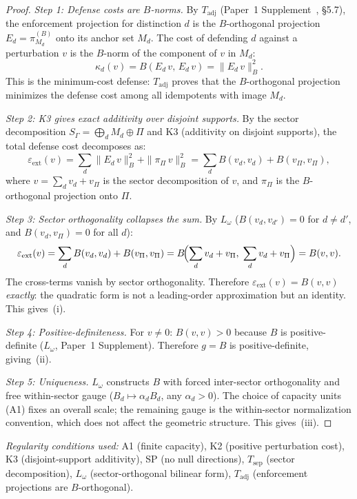 \documentclass[11pt,a4paper]{article}
\theoremstyle{definition}
\begin{document}
\begin{proof}
\textit{Step 1: Defense costs are $B$-norms.}\quad
By $T_{\mathrm{adj}}$ (Paper~1 Supplement~\cite{BrookeSupplement}, \S5.7),
the enforcement projection for distinction $d$ is the $B$-orthogonal
projection $E_d = \pi_{M_d}^{(B)}$ onto its anchor set $M_d$.  The cost
of defending $d$ against a perturbation $v$ is the $B$-norm of the
component of $v$ in $M_d$:
\[
  \kappa_d(v) = B(E_d\, v,\, E_d\, v) = \|E_d\, v\|_B^2.
\]
This is the minimum-cost defense: $T_{\mathrm{adj}}$ proves that the
$B$-orthogonal projection minimizes the defense cost among all
idempotents with image $M_d$.

\textit{Step 2: K3 gives exact additivity over disjoint supports.}\quad
By the sector decomposition $S_\Gamma = \bigoplus_d M_d \oplus \Pi$ and
K3 (additivity on disjoint supports), the total defense cost decomposes
as:
\[
  \varepsilon_{\mathrm{ext}}(v)
  = \sum_{d} \|E_d\, v\|_B^2 + \|\pi_\Pi\, v\|_B^2
  = \sum_{d} B(v_d, v_d) + B(v_\Pi, v_\Pi),
\]
where $v = \sum_d v_d + v_\Pi$ is the sector decomposition of $v$,
and $\pi_\Pi$ is the $B$-orthogonal projection onto $\Pi$.

\textit{Step 3: Sector orthogonality collapses the sum.}\quad
By $L_\omega$ ($B(v_d, v_{d'}) = 0$ for $d \ne d'$, and
$B(v_d, v_\Pi) = 0$ for all $d$):
\[
  \varepsilon_{\mathrm{ext}}(v)
  = \sum_d B(v_d, v_d) + B(v_\Pi, v_\Pi)
  = B\!\Bigl(\sum_d v_d + v_\Pi,\; \sum_d v_d + v_\Pi\Bigr)
  = B(v, v).
\]
The cross-terms vanish by sector orthogonality.  Therefore
$\varepsilon_{\mathrm{ext}}(v) = B(v,v)$ \emph{exactly}: the quadratic
form is not a leading-order approximation but an identity.  This
gives~(i).

\textit{Step 4: Positive-definiteness.}\quad
For $v \ne 0$: $B(v,v) > 0$ because $B$ is positive-definite
($L_\omega$, Paper~1 Supplement).  Therefore $g = B$ is
positive-definite, giving~(ii).

\textit{Step 5: Uniqueness.}\quad
$L_\omega$ constructs $B$ with forced inter-sector orthogonality and
free within-sector gauge ($B_d \mapsto \alpha_d B_d$, any $\alpha_d > 0$).
The choice of capacity units (A1) fixes an overall scale; the remaining
gauge is the within-sector normalization convention, which does not
affect the geometric structure.  This gives~(iii).
\end{proof}

\smallskip\noindent\textit{Regularity conditions used:}
A1 (finite capacity), K2 (positive perturbation cost), K3 (disjoint-support
additivity), SP (no null directions), $T_{\mathrm{sep}}$ (sector
decomposition), $L_\omega$ (sector-orthogonal bilinear form),
$T_{\mathrm{adj}}$ (enforcement projections are $B$-orthogonal).
\end{document}
